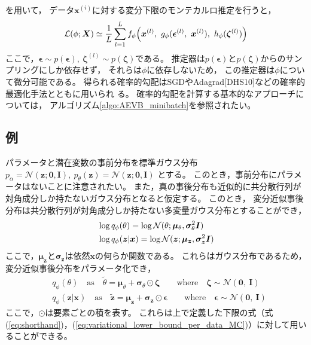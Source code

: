 \documentclass[dvipdfmx, fleqn]{jsarticle}
\begin{document}
を用いて，
データ\(\bm{x}^{(i)}\)に対する変分下限のモンテカルロ推定を行うと，
\begin{equation}
    \mathcal{L}(\phi; \bm{X}) \simeq \frac{1}{L} \sum_{l=1}^{L} f_{\phi} \qty(\bm{x}^{(l)},\ g_{\phi} (\bm{\epsilon}^{(l)},\ \bm{x}^{(l)}),\ h_{\phi} (\bm{\zeta}^{(l)}))
    \label{eq:variational_lower_bound_per_data_MC}
\end{equation}
ここで，\(\bm{\epsilon} \sim p(\bm{\epsilon}),\ \bm{\zeta}^{(l)} \sim p(\bm{\zeta})\)である。
推定器は\(p(\bm{\epsilon})\)と\(p(\bm{\zeta})\)からのサンプリングにしか依存せず，
それらは\(\phi\)に依存しないため，
この推定器は\(\phi\)について微分可能である。
得られる確率的勾配はSGDやAdagrad[DHS10]などの確率的最適化手法とともに用いられ
る。
確率的勾配を計算する基本的なアプローチについては，
アルゴリズム\ref{algo:AEVB_minibatch}を参照されたい。


\subsection{例}

パラメータと潜在変数の事前分布を標準ガウス分布
\(p_{\alpha} = \mathcal{N}(\bm{z}; \bm{0}, \bm{I}),\ p_{\theta} (\bm{z}) = \mathcal{N}(\bm{z}; \bm{0}, \bm{I})\)
とする。
このとき，事前分布にパラメータはないことに注意されたい。
また，真の事後分布も近似的に共分散行列が対角成分しか持たないガウス分布となると仮定する。
このとき，
変分近似事後分布は共分散行列が対角成分しか持たない多変量ガウス分布とすることができ，
\begin{align}
    & \log{q_{\phi} (\theta)} = \log{\mathcal{N}(\theta; \bm{\mu}_{\theta}, \bm{\sigma}_{\theta}^2 \bm{I})} \notag \\
    & \log{q_{\phi} (\bm{z} | \bm{x})} = \log{\mathcal{N}(\bm{z}; \bm{\mu}_{\bm{z}}, \bm{\sigma}_{\bm{z}}^2 \bm{I})}
\end{align}
ここで，\(\bm{\mu}_{\bm{z}}\)と\(\bm{\sigma}_{\bm{z}}\)は依然\(\bm{x}\)の何らか関数である。
これらはガウス分布であるため，
変分近似事後分布をパラメータ化でき，
\begin{align*}
    & q_{\phi} (\theta)
        \quad \text{as} \quad
        \tilde{\theta} = \bm{\mu}_{\theta} + \bm{\sigma}_{\theta} \odot \bm{\zeta}
        \qquad \text{where} \quad
        \bm{\zeta} \sim \mathcal{N}(\bm{0},\ \bm{I}) \\
    & q_{\phi} (\bm{z} | \bm{x})
        \quad \text{as} \quad
        \tilde{\bm{z}} = \bm{\mu}_{\bm{z}} + \bm{\sigma}_{\bm{z}} \odot \bm{\epsilon}
        \qquad \text{where} \quad
        \bm{\epsilon} \sim \mathcal{N}(\bm{0},\ \bm{I})
\end{align*}
ここで，\(\odot\)は要素ごとの積を表す。
これらは上で定義した下限の式（式(\ref{eq:shorthand})，(\ref{eq:variational_lower_bound_per_data_MC})）に対して用いることができる。
\end{document}
